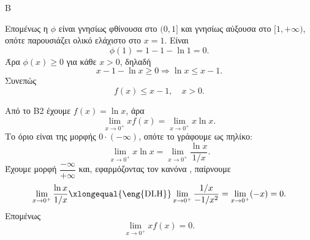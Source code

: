 \begin{thema}{Β}
\begin{erwthma}
Επομένως η $\phi$ είναι γνησίως φθίνουσα στο $(0,1]$ και γνησίως αύξουσα στο $[1,+\infty)$, οπότε παρουσιάζει ολικό ελάχιστο στο $x=1$. Είναι
\[
\phi(1)=1-1-\ln 1=0.
\]
Άρα $\phi(x)\geq 0$ για κάθε $x>0$, δηλαδή
\[
x-1-\ln x\geq 0 \Rightarrow \ln x\leq x-1.
\]
Συνεπώς
\[
f(x)\leq x-1,\quad x>0.
\]

\item Από το Β2 έχουμε $f(x)=\ln x$, άρα
\[
\lim_{x\to 0^+}x f(x)=\lim_{x\to 0^+}x\ln x.
\]
Το όριο είναι της μορφής $0\cdot(-\infty)$, οπότε το γράφουμε ως πηλίκο:
\[
\lim_{x\to 0^+}x\ln x=\lim_{x\to 0^+}\frac{\ln x}{1/x}.
\]
Έχουμε μορφή $\dfrac{-\infty}{+\infty}$ και, εφαρμόζοντας τον κανόνα , παίρνουμε
\[
\lim_{x\to 0^+}\frac{\ln x}{1/x}
\xlongequal{\text{\eng{DLH}}}
\lim_{x\to 0^+}\frac{1/x}{-1/x^2}
=\lim_{x\to 0^+}(-x)=0.
\]
Επομένως
\[
\lim_{x\to 0^+}x f(x)=0.
\]
\end{erwthma}
\end{thema}


